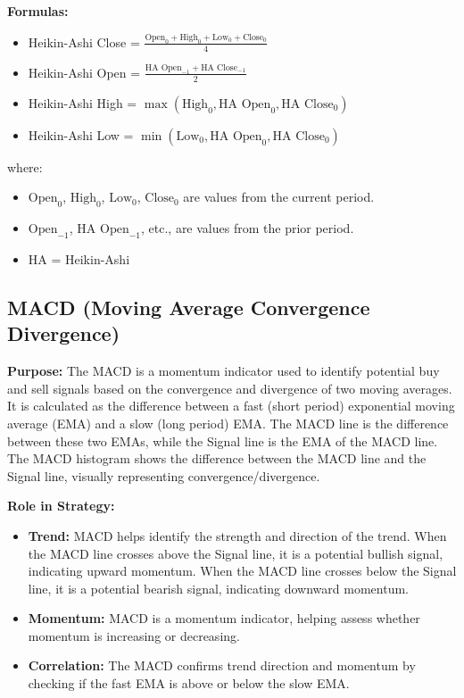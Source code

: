 \documentclass[12pt]{article}
\begin{document}
\textbf{Formulas:}
\begin{itemize}
    \item Heikin-Ashi Close = $\frac{\text{Open}_0 + \text{High}_0 + \text{Low}_0 + \text{Close}_0}{4}$
    \item Heikin-Ashi Open = $\frac{\text{HA Open}_{-1} + \text{HA Close}_{-1}}{2}$
    \item Heikin-Ashi High = $\max(\text{High}_0, \text{HA Open}_0, \text{HA Close}_0)$
    \item Heikin-Ashi Low = $\min(\text{Low}_0, \text{HA Open}_0, \text{HA Close}_0)$
\end{itemize}
where:
\begin{itemize}
    \item $\text{Open}_0$, $\text{High}_0$, $\text{Low}_0$, $\text{Close}_0$ are values from the current period.
    \item $\text{Open}_{-1}$, $\text{HA Open}_{-1}$, etc., are values from the prior period.
    \item HA = Heikin-Ashi
\end{itemize}

\subsection{MACD (Moving Average Convergence Divergence)}
\textbf{Purpose:} The MACD is a momentum indicator used to identify potential buy and sell signals based on the convergence and divergence of two moving averages. It is calculated as the difference between a fast (short period) exponential moving average (EMA) and a slow (long period) EMA. The MACD line is the difference between these two EMAs, while the Signal line is the EMA of the MACD line. The MACD histogram shows the difference between the MACD line and the Signal line, visually representing convergence/divergence.

\textbf{Role in Strategy:}
\begin{itemize}
    \item \textbf{Trend:} MACD helps identify the strength and direction of the trend. When the MACD line crosses above the Signal line, it is a potential bullish signal, indicating upward momentum. When the MACD line crosses below the Signal line, it is a potential bearish signal, indicating downward momentum.
    \item \textbf{Momentum:} MACD is a momentum indicator, helping assess whether momentum is increasing or decreasing.
    \item \textbf{Correlation:} The MACD confirms trend direction and momentum by checking if the fast EMA is above or below the slow EMA.
\end{itemize}
\end{document}
